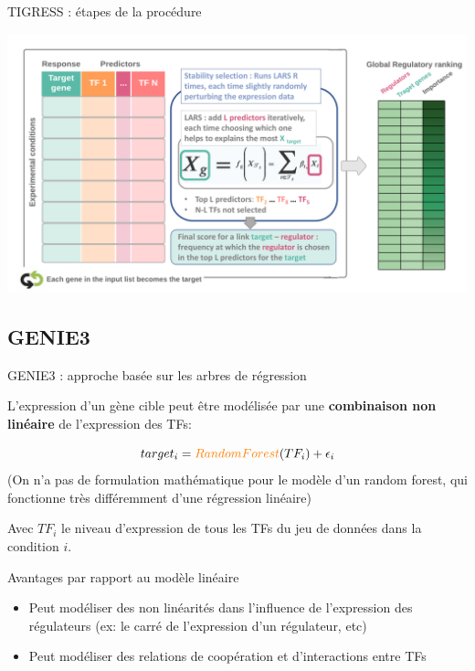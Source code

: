 \begin{frame}{TIGRESS : étapes de la procédure}
\begin{overprint}
	  \includegraphics[scale=0.35]{Figures/Regression/tigress_4-end.pdf}
	 
	\end{overprint}
\end{frame}
	
	





\subsection{GENIE3}




\begin{frame}{GENIE3 : approche basée sur les arbres de régression}

L'expression d'un gène cible peut être modélisée par une \textbf{combinaison non linéaire} de l'expression des TFs:

    
    \begin{equation*}
    	   target_i = \textcolor{orange}{Random Forest}(TF_i) + \epsilon_i
    \end{equation*}
\scriptsize{(On n'a pas de formulation mathématique pour le modèle d'un random forest, qui fonctionne très différemment d'une régression linéaire)}

\small 
Avec $TF_i$ le niveau d'expression de tous les TFs du jeu de données dans la condition $i$.



\begin{block}{\small Avantages par rapport au modèle linéaire}
\begin{itemize}\scriptsize
    \item Peut modéliser des non linéarités dans l'influence de l'expression des régulateurs (ex: le carré de l'expression d'un régulateur, etc)
    \item Peut modéliser des relations de coopération et d'interactions entre TFs
\end{itemize}
\end{block}

\end{frame}




